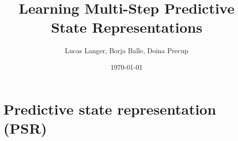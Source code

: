 \documentclass{beamer}
\title[Multi-Step PSR]{Learning Multi-Step Predictive State Representations} %
\author{Lucas Langer, Borja Balle, Doina Precup} %
\institute[McGill University] %
{
\\
\medskip
}
\date{\today} %
\begin{document}
\begin{frame}
\titlepage %
\end{frame}

\begin{comment}
\begin{frame}
\frametitle{Overview} %
\tableofcontents %
\end{frame}
\end{comment}



\section{Predictive state representation (PSR)} %



\end{document}
